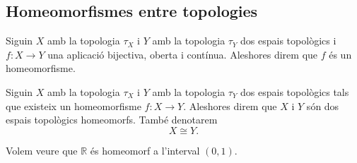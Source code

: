 \documentclass[../../Main.tex]{subfiles}
\begin{document}
	\subsection{Homeomorfismes entre topologies}
	\begin{definition}[Homeomorfisme]
		\label{def:homeomorfisme entre topologies}
		Siguin \(X\) amb la topologia \(\tau_{X}\) i \(Y\) amb la topologia \(\tau_{Y}\) dos espais topològics i \(f\colon X\longrightarrow Y\) una aplicació bijectiva, oberta i contínua. Aleshores direm que \(f\) és un homeomorfisme.
	\end{definition}
	\begin{definition}
		\label{def:espais topològics homeomorfs}
		Siguin \(X\) amb la topologia \(\tau_{X}\) i \(Y\) amb la topologia \(\tau_{Y}\) dos espais topològics tals que existeix un homeomorfisme \(f\colon X\longrightarrow Y\). Aleshores direm que \(X\) i \(Y\) són dos espais topològics homeomorfs. També denotarem
		\[
		    X\cong Y.
		\]
	\end{definition}
	\begin{example}
		\label{ex:R és homeomorf a l'interval (0,1)}
		Volem veure que \(\mathbb{R}\) és homeomorf a l'interval \((0,1)\).
		\begin{solution}
		\end{solution}
	\end{example}
\end{document}
